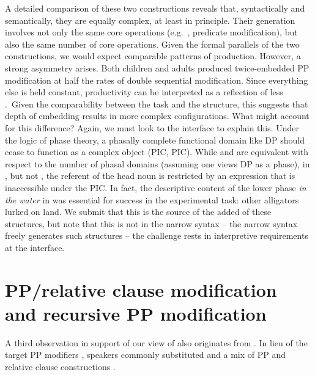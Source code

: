 \documentclass[output=paper]{langsci/langscibook}
\begin{document}
A detailed comparison of these two constructions reveals that, syntactically
and semantically, they are equally complex, at least in principle. Their
generation involves not only the same core operations (e.g.\ , predicate
modification), but also the same number of core operations. Given the formal
parallels of the two constructions, we would expect comparable patterns of
production. However, a strong asymmetry arises. Both children and adults
produced twice-embedded PP modification at half the rates of double sequential
modification. Since everything else is held constant, productivity can be
interpreted as a reflection of less .~Given the comparability
between the task and the structure, this suggests that depth of embedding
results in more complex configurations. What might account for this difference?
Again, we must look to the interface to explain this. Under the logic of
phase theory, a phasally complete functional domain like DP should
cease to function as a complex object (\glsdesc{PIC},
\gls{PIC}). While
 and  are equivalent with respect to the number
of phasal domains (assuming one views DP as a phase), in
, but not , the referent of the head noun is
restricted by an expression that is inaccessible under the \gls{PIC}.  In fact, the descriptive content of the lower
phase \emph{in the water} in  was essential for
success in the experimental task: other alligators lurked on land. We submit
that this is the source of the added  of these structures, but
note that this is not  in the narrow syntax -- the narrow
syntax freely generates such structures -- the challenge rests in interpretive
requirements at the interface.

\section{PP/relative clause modification and recursive PP
modification}\label{sec:02.4}

A third observation in support of our view of  also originates
from \citet{Perez-LerouxEtAl2018b}.  In lieu of the target PP modifiers
, speakers commonly substituted 
 and a mix of PP and relative clause
constructions .
\end{document}
